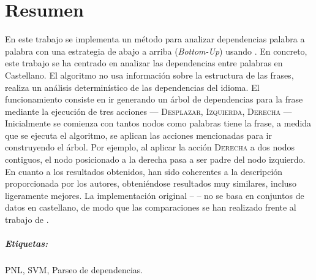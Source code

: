 \begingroup
\let\clearpage\relax
\let\cleardoublepage\relax
\let\cleardoublepage\relax


\chapter*{Resumen}
En este trabajo se implementa un método para analizar dependencias palabra a
palabra con una estrategia de abajo a arriba (\textit{Bottom-Up}) usando
. En concreto, este trabajo se ha centrado en analizar las
dependencias entre palabras en Castellano. El algoritmo no usa información sobre
la estructura de las frases, realiza un análisis determinístico de las
dependencias del idioma. El funcionamiento consiste en ir generando un árbol de
dependencias para la frase mediante la ejecución de tres acciones ---
\textsc{Desplazar, Izquierda, Derecha} --- Inicialmente se comienza con tantos
nodos como palabras tiene la frase, a medida que se ejecuta el algoritmo, se
aplican las acciones mencionadas para ir construyendo el árbol. Por ejemplo, al
aplicar la acción \textsc{Derecha} a dos nodos contiguos, el nodo posicionado a
la derecha pasa a ser padre del nodo izquierdo. En cuanto a los resultados
obtenidos, han sido coherentes a la descripción proporcionada por los autores,
obteniéndose resultados muy similares, incluso ligeramente mejores. La
implementación original -- \citet{yamada2003} -- no se basa en conjuntos de
datos en castellano, de modo que las comparaciones se han realizado frente al
trabajo de \citet{rohit2016}.

\paragraph{Etiquetas:} PNL, SVM, Parseo de dependencias.

\vfill

